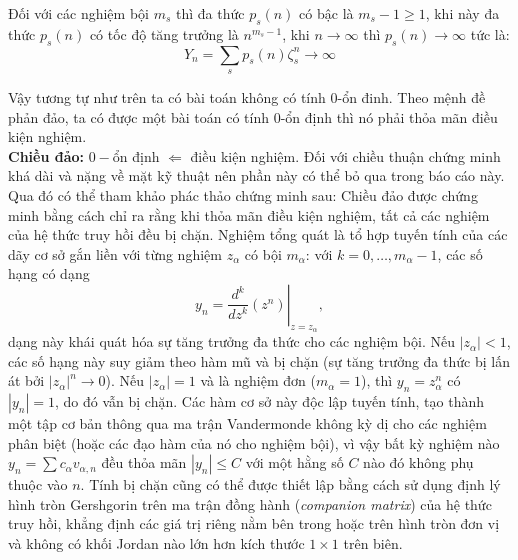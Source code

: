 Đối với các nghiệm bội $m_s$ thì đa thức $p_s(n)$ có bậc là $m_s -1 \ge 1$, khi này đa thức $p_s(n)$ có tốc độ tăng trưởng là $n^{m_s -1}$, khi $n \to \infty$ thì $p_s(n) \to \infty$ tức là:
\[
Y_n = \sum_{s} p_s(n) \zeta_s^n \to \infty 
\]

Vậy tương tự như trên ta có bài toán không có tính $0$-ổn đinh. Theo mệnh đề phản đảo, ta có được một bài toán có tính $0$-ổn định thì nó phải thỏa mãn điều kiện nghiệm.\\

\noindent\textbf{Chiều đảo:} $0-$ổn định $\Leftarrow$ điều kiện nghiệm.
Đối với chiều thuận chứng minh khá dài và nặng về mặt kỹ thuật nên phần này có thể bỏ qua trong báo cáo này. Qua đó có thể tham khảo phác thảo chứng minh sau:
Chiều đảo được chứng minh bằng cách chỉ ra rằng khi thỏa mãn điều kiện nghiệm, tất cả các nghiệm của hệ thức truy hồi đều bị chặn. Nghiệm tổng quát là tổ hợp tuyến tính của các dãy cơ sở gắn liền với từng nghiệm $z_\alpha$ có bội $m_\alpha$: với $k = 0, \dots, m_\alpha - 1$, các số hạng có dạng
\[
    y_n = \left. \frac{d^k}{dz^k} (z^n) \right|_{z=z_\alpha},
\]
dạng này khái quát hóa sự tăng trưởng đa thức cho các nghiệm bội. Nếu $|z_\alpha| < 1$, các số hạng này suy giảm theo hàm mũ và bị chặn (sự tăng trưởng đa thức bị lấn át bởi $|z_\alpha|^n \to 0$). Nếu $|z_\alpha| = 1$ và là nghiệm đơn ($m_\alpha = 1$), thì $y_n = z_\alpha^n$ có $|y_n| = 1$, do đó vẫn bị chặn. Các hàm cơ sở này độc lập tuyến tính, tạo thành một tập cơ bản thông qua ma trận Vandermonde không kỳ dị cho các nghiệm phân biệt (hoặc các đạo hàm của nó cho nghiệm bội), vì vậy bất kỳ nghiệm nào $y_n = \sum c_\alpha v_{\alpha, n}$ đều thỏa mãn $|y_n| \le C$ với một hằng số $C$ nào đó không phụ thuộc vào $n$. Tính bị chặn cũng có thể được thiết lập bằng cách sử dụng định lý hình tròn Gershgorin trên ma trận đồng hành (\textit{companion matrix}) của hệ thức truy hồi, khẳng định các giá trị riêng nằm bên trong hoặc trên hình tròn đơn vị và không có khối Jordan nào lớn hơn kích thước $1 \times 1$ trên biên.


